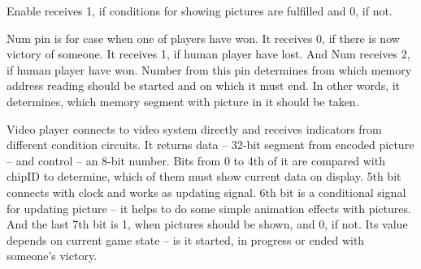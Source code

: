 \documentclass[12pt,a4paper]{article}
\begin{document}
    Enable receives 1, if conditions for showing pictures are fulfilled and 0, if not.

    Num pin is for case when one of players have won. It receives 0, if there is now victory of someone. It receives 1, if human player have lost. And Num receives 2, if human player have won. Number from this pin determines from which memory address reading should be started and on which it must end. In other words, it determines, which memory segment with picture in it should be taken. 

    Video player connects to video system directly and receives indicators from different condition circuits. 
It returns data – 32-bit segment from encoded picture – and control – an 8-bit number. Bits from 0 to 4th of it are compared with chipID to determine, which of them must show current data on display. 5th bit connects with clock and works as updating signal. 6th bit is a conditional signal for updating picture – it helps to do some simple animation effects with pictures. And the last 7th bit is 1, when pictures should be shown, and 0, if not. Its value depends on current game state – is it started, in progress or ended with someone’s victory.






    
\end{document}

